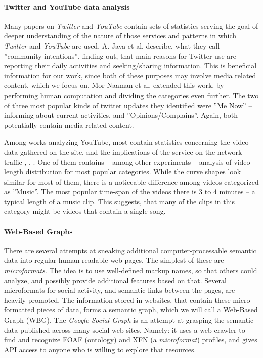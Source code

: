 \paragraph{Twitter and YouTube data analysis} Many papers on \textit{Twitter}
and \textit{YouTube} contain sets of statistics serving the goal of
deeper understanding of the nature of those services and patterns in which
\textit{Twitter} and \textit{YouTube} are used. A. Java et al. \cite{why-we-twitter}
describe, what they call ''community intentions'', finding out, that main reasons for
Twitter use are reporting their daily activities and seeking/sharing information. This
is beneficial information for our work, since both of these purposes may involve media
related content, which we focus on. Mor Naaman et al. \cite{twitter-content-is-it}
extended this work, by performing human computation and dividing the categories even further.
The two of three most popular kinds of twitter updates they identified were
''Me Now'' -- informing about current activities, and ''Opinions/Complains''.
Again, both potentially contain media-related content.

Among works analyzing YouTube, most contain statistics concerning the video
data gathered on the site, and the implications of the service on the network
traffic \cite{i-tube-you-tube}, \cite{views-from-the-edge},
\cite{statistics-and-social-network}. One of them
\cite{statistics-and-social-network} contains -- among other experiments --
analysis of video length distribution for most popular categories.  While the
curve shapes look similar for most of them, there is a noticeable difference
among videos categorized as ''Music''. The most popular time-span of the videos
there is 3 to 4 minutes -- a typical length of a music clip. This suggests,
that many of the clips in this category might be videos that contain a single song.

\paragraph{Web-Based Graphs} There are several attempts at sneaking additional
computer-processable semantic data into regular human-readable web pages.  The
simplest of these are \textit{microformats}. The idea is to use well-defined
markup names, so that others could analyze, and possibly provide additional
features based on that. Several microformats for social activity, and semantic
links between the pages, are heavily promoted. The information stored in
websites, that contain these micro-formatted pieces of data, forms a semantic
graph, which we will call a Web-Based Graph (WBG).  
The \textit{Google Social Graph} is an attempt at grasping
the semantic data published across many social web sites. Namely: it uses a web
crawler to find and recognize FOAF (ontology) and XFN (a \textit{microformat}) profiles,
and gives API access to anyone who is willing to explore that resources.

